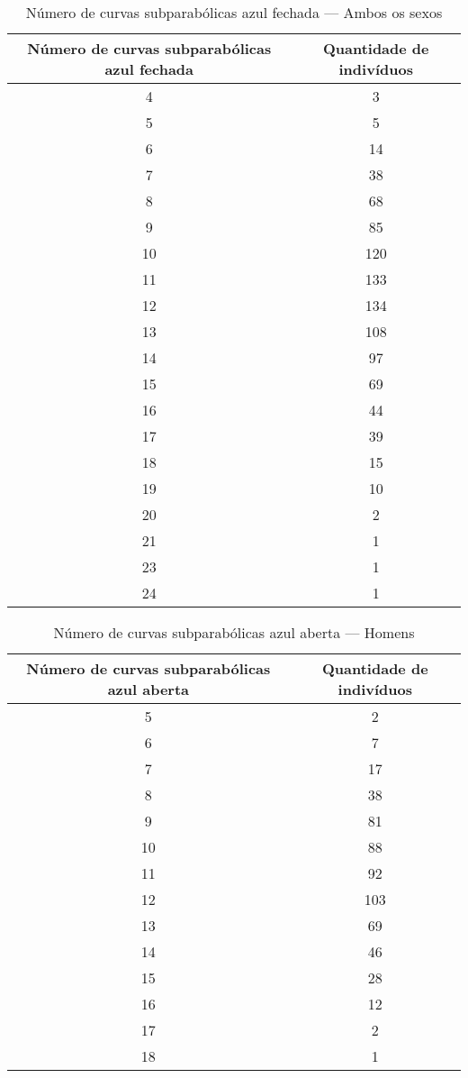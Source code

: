 \documentclass[a4paper,12pt]{article}
\begin{document}
\begin{table}[h!]
\centering
\caption{Número de curvas subparabólicas azul fechada — Ambos os sexos}
\begin{tabular}{c c}
\hline
\textbf{Número de curvas subparabólicas azul fechada} & \textbf{Quantidade de indivíduos} \\ 
\hline
4  & 3  \\
5  & 5  \\
6  & 14 \\
7  & 38 \\
8  & 68 \\
9  & 85 \\
10 & 120 \\
11 & 133 \\
12 & 134 \\
13 & 108 \\
14 & 97 \\
15 & 69 \\
16 & 44 \\
17 & 39 \\
18 & 15 \\
19 & 10 \\
20 & 2  \\
21 & 1  \\
23 & 1  \\
24 & 1  \\
\hline
\end{tabular}
\end{table}


\begin{table}[h!]
\centering
\caption{Número de curvas subparabólicas azul aberta — Homens}
\begin{tabular}{c c}
\hline
\textbf{Número de curvas subparabólicas azul aberta} & \textbf{Quantidade de indivíduos} \\ 
\hline
5  & 2  \\
6  & 7  \\
7  & 17 \\
8  & 38 \\
9  & 81 \\
10 & 88 \\
11 & 92 \\
12 & 103 \\
13 & 69 \\
14 & 46 \\
15 & 28 \\
16 & 12 \\
17 & 2  \\
18 & 1  \\
\hline
\end{tabular}
\end{table}
\end{document}
